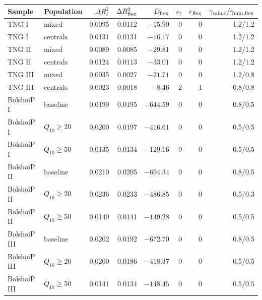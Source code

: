 \begin{tabular}{llrrrrrr}
\toprule
Sample & Population & $\Delta R^2_\ell$ & $\Delta R^2_{\rm flex}$ & $D_{\rm flex}$ & $e_\ell$ & $e_{\rm flex}$ & $\gamma_{\min,\ell}/\gamma_{\min,\rm flex}$\\
\midrule
TNG I & mixed & 0.0095 & 0.0112 & $-15.90$ & 0 & 0 & 1.2/1.2\\
TNG I & centrals & 0.0131 & 0.0131 & $-16.17$ & 0 & 0 & 1.2/1.2\\
TNG II & mixed & 0.0089 & 0.0085 & $-29.81$ & 0 & 0 & 1.2/1.2\\
TNG II & centrals & 0.0124 & 0.0113 & $-33.01$ & 0 & 0 & 1.2/1.2\\
TNG III & mixed & 0.0035 & 0.0027 & $-21.71$ & 0 & 0 & 1.2/0.8\\
TNG III & centrals & 0.0023 & 0.0018 & $-8.46$ & 2 & 1 & 0.8/0.8\\
BolshoiP I & baseline & 0.0199 & 0.0195 & $-644.59$ & 0 & 0 & 0.8/0.5\\
BolshoiP I & $Q_{10}\geq20$ & 0.0200 & 0.0197 & $-416.61$ & 0 & 0 & 0.5/0.5\\
BolshoiP I & $Q_{10}\geq50$ & 0.0135 & 0.0134 & $-129.16$ & 0 & 0 & 0.5/0.5\\
BolshoiP II & baseline & 0.0210 & 0.0205 & $-694.34$ & 0 & 0 & 0.8/0.5\\
BolshoiP II & $Q_{10}\geq20$ & 0.0236 & 0.0233 & $-486.85$ & 0 & 0 & 0.5/0.3\\
BolshoiP II & $Q_{10}\geq50$ & 0.0140 & 0.0141 & $-149.28$ & 0 & 0 & 0.5/0.5\\
BolshoiP III & baseline & 0.0202 & 0.0192 & $-672.70$ & 0 & 0 & 0.8/0.5\\
BolshoiP III & $Q_{10}\geq20$ & 0.0200 & 0.0186 & $-418.37$ & 0 & 0 & 0.5/0.5\\
BolshoiP III & $Q_{10}\geq50$ & 0.0141 & 0.0134 & $-148.45$ & 0 & 0 & 0.5/0.5\\
\bottomrule
\end{tabular}
